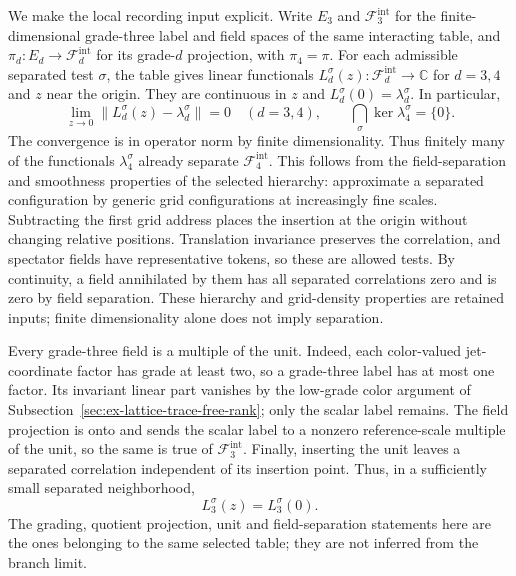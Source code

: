 We make the local recording input explicit. Write $E_3$ and $\mathcal F_3^{\mathrm{int}}$
for the finite-dimensional grade-three label and field spaces of the same
interacting table, and $\pi_d:E_d\to\mathcal F_d^{\mathrm{int}}$ for its grade-$d$
projection, with $\pi_4=\pi$.
For each admissible separated test $\sigma$, the table gives linear functionals
$L^{\sigma}_d(z):\mathcal F_d^{\mathrm{int}}\to\mathbb C$ for $d=3,4$ and $z$ near the origin.
They are continuous in $z$ and $L^{\sigma}_d(0)=\lambda^{\sigma}_d$. In particular,
\begin{equation}
 \lim_{z\to0}\|L^{\sigma}_d(z)-\lambda^{\sigma}_d\|=0
 \quad(d=3,4),\qquad
 \bigcap_{\sigma}\ker\lambda^{\sigma}_4=\{0\}.
 \label{eq:ex-branch-test-properties}
\end{equation}
The convergence is in operator norm by finite dimensionality. Thus finitely
many of the functionals $\lambda^{\sigma}_4$ already separate
$\mathcal F_4^{\mathrm{int}}$.
This follows from the field-separation and smoothness properties of the
selected hierarchy: approximate a separated configuration by generic grid
configurations at increasingly fine scales. Subtracting the first grid
address places the insertion at the origin without changing relative
positions. Translation invariance preserves the correlation, and spectator
fields have representative tokens, so these are allowed tests. By continuity,
a field annihilated by them has all separated correlations zero and is zero
by field separation. These hierarchy and
grid-density properties are retained inputs; finite dimensionality alone
does not imply separation.

Every grade-three field is a multiple of the unit. Indeed, each color-valued
jet-coordinate factor has grade at least two, so a grade-three label has at
most one factor. Its invariant linear part vanishes by the low-grade color
argument of Subsection~\ref{sec:ex-lattice-trace-free-rank}; only the scalar
label remains. The field projection is onto and sends the scalar label to
a nonzero reference-scale multiple of the unit, so the same is true of
$\mathcal F_3^{\mathrm{int}}$. Finally, inserting the unit leaves a separated
correlation independent of its insertion point. Thus, in a sufficiently
small separated neighborhood,
\begin{equation}
 L^{\sigma}_3(z)=L^{\sigma}_3(0).
 \label{eq:ex-branch-grade-three-unit}
\end{equation}
The grading, quotient projection, unit and field-separation statements here
are the ones belonging to the same selected table; they are not inferred
from the branch limit.

